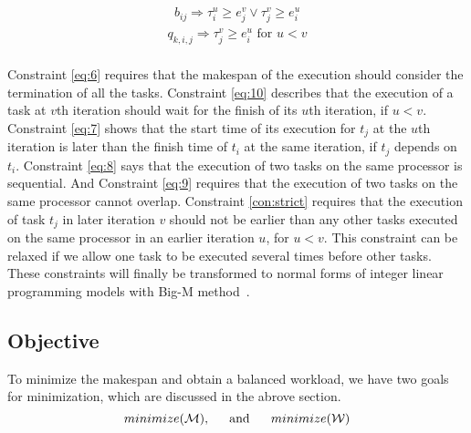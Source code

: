 	\begin{equation}\label{eq:9}
	\begin{array}{l}
		b_{ij} \Rightarrow \tau^{u}_{i}\geq e^v_j \vee \tau^{v}_{j}\geq e^u_i

	\end{array}
	\end{equation}
	\begin{equation}\label{con:strict}
	\begin{array}{l}
		q_{k,i,j} \Rightarrow \tau^v_j\geq  e^u_i  \textrm{ for } u<v \\
	\end{array}
	\end{equation}
	
Constraint \ref{eq:6} requires that the makespan of the  execution  should consider the termination of all the tasks.
Constraint \ref{eq:10} describes that 	
the execution of a task at $v$th iteration should wait for the finish of its $u$th iteration, if $u< v$.
Constraint \ref{eq:7} shows that the start time of its execution for $t_j$ at the $u$th iteration is later than the finish time of $t_i$ at the same iteration, if $t_j$ depends on $t_i$.
Constraint \ref{eq:8} says that the execution of two tasks on the same processor is sequential. And Constraint \ref{eq:9} requires that the execution of two tasks on the same processor cannot overlap.
Constraint \ref{con:strict} requires that the execution of task $t_j$ in later iteration $v$ should not be earlier than any other tasks executed on the same processor in an earlier iteration $u$, for $u< v$. This constraint can be relaxed if we allow one task to be executed several times before other tasks. These constraints will finally be transformed to normal forms of integer linear programming models with Big-M method~\cite{winston2003introduction}.

\vspace{-5pt}
\subsection{Objective}
To minimize the makespan and obtain a balanced workload, we have two goals for minimization, which are discussed in the abrove section. 
	\begin{equation}
		minimize({\cal{M}}) \textrm{, ~~~  and  ~~~     }	minimize({\cal{W}})
	\end{equation} 
	

